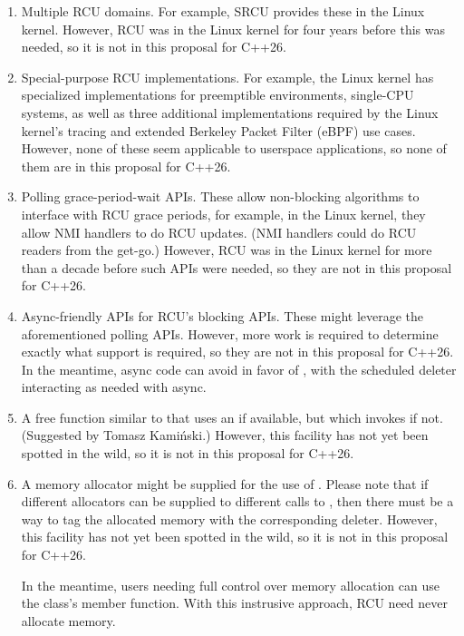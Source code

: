 \begin{enumerate}
\item	Multiple RCU domains.
	For example, SRCU provides these in the Linux kernel.
	However, RCU was in the Linux kernel for four years before
	this was needed, so it is not in this proposal for C++26.
\item	Special-purpose RCU implementations.
	For example, the Linux kernel has specialized implementations
	for preemptible environments, single-CPU systems,
	as well as three additional implementations required by
	the Linux kernel's tracing and extended Berkeley Packet
	Filter (eBPF) use cases.
	However, none of these seem applicable to userspace applications,
	so none of them are in this proposal for C++26.
\item	Polling grace-period-wait APIs.
	These allow non-blocking algorithms to interface with RCU
	grace periods, for example, in the Linux kernel, they allow
	NMI handlers to do RCU updates.
	(NMI handlers could do RCU readers from the get-go.)
	However, RCU was in the Linux kernel for more than a decade before
	such APIs were needed, so they are not in this proposal for C++26.
\item	Async-friendly APIs for RCU's blocking APIs.
	These might leverage the aforementioned polling APIs.
	However, more work is required to determine exactly what support
	is required, so they are not in this proposal for C++26.
	In the meantime, async code can avoid 
	in favor of , with the scheduled deleter
	interacting as needed with async.
\item	A free function similar to  that uses
	an  if available, but which invokes
	 if not.
	(Suggested by Tomasz Kami\'{n}ski.)
	However, this facility has not yet been spotted in the wild,
	so it is not in this proposal for C++26.
\item	A memory allocator might be supplied for the use of
	.
	Please note that if different allocators can be supplied to
	different calls to , then there must be a way
	to tag the allocated memory with the corresponding deleter.
	However, this facility has not yet been spotted in the wild,
	so it is not in this proposal for C++26.

	In the meantime, users needing full control over memory allocation
	can use the  class's 
	member function.
	With this instrusive approach, RCU need never allocate memory.


\end{enumerate}
